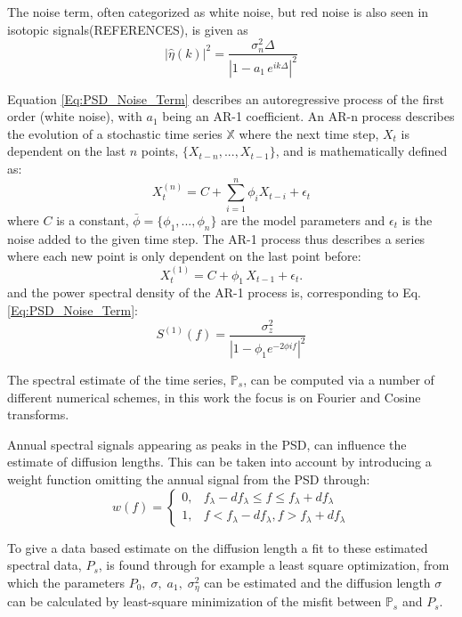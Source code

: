 \documentclass[../../CompleteThesis2/Complete_2ndDraft]{subfiles}
\begin{document}
The noise term, often categorized as white noise, but red noise is also seen in isotopic signals(REFERENCES), is given as
\begin{equation}
	|\hat{\eta}(k)|^2 = \frac{\sigma_n^2 \Delta}{|1 - a_1 \, e^{ik\Delta}|^2}
	\label{Eq:PSD_Noise_Term}
\end{equation}

Equation \ref{Eq:PSD_Noise_Term} describes an autoregressive process of the first order (white noise), with $a_1$ being an AR-1 coefficient. An AR-n process describes the evolution of a stochastic time series $\mathbb{X}$ where the next time step, $X_t$ is dependent on the last $n$ points, $\{X_{t-n},...,X_{t-1}\}$, and is mathematically defined as:
\begin{equation}
	X_t^{(n)} = C + \sum_{i=1}^{n}\phi_i X_{t-i} + \epsilon_t
	\label{Eq:AR-n}
\end{equation}
where $C$ is a constant, $\bar{\phi} = \{\phi_1,...,\phi_{n}\}$ are the model parameters and $\epsilon_t$ is the noise added to the given time step. The AR-1 process thus describes a series where each new point is only dependent on the last point before:
\begin{equation}
	X_t^{(1)} = C + \phi_{1}\, X_{t-1} + \epsilon_t.
	\label{Eq:AR-1}
\end{equation} 
and the power spectral density of the AR-1 process is, corresponding to Eq. \ref{Eq:PSD_Noise_Term}:
\begin{equation}
	S^{(1)}(f) = \frac{\sigma_z^2}{|1 - \phi_{1}e^{-2\phi i f}|^2}
\end{equation}

The spectral estimate of the time series, $\mathbb{P}_s$, can be computed via a number of different numerical schemes, in this work the focus is on Fourier and Cosine transforms. 


Annual spectral signals appearing as peaks in the PSD, can influence the  estimate of diffusion lengths. This can be taken into account by introducing a weight function omitting the annual signal from the PSD through:
\begin{equation}
	w(f) = \begin{cases}
		0, & f_{\lambda} - d f_{\lambda} \leq f \leq f_{\lambda} + d f_{\lambda} \\
		1, & f < f_{\lambda} - d f_{\lambda}, f > f_{\lambda} + d f_{\lambda}
	\end{cases}
\end{equation}

To give a data based estimate on the diffusion length a fit to these estimated spectral data, $P_s$, is found through for example a least square optimization, from which the parameters $P_0, \; \sigma, \; a_1, \; \sigma_{\eta}^2$ can be estimated and the diffusion length $\sigma$ can be calculated by least-square minimization of the misfit between $\mathbb{P}_s$ and $P_s$.
\end{document}
